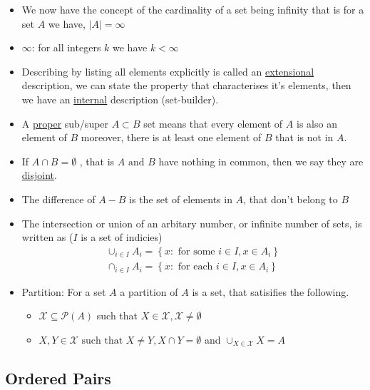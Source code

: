 \documentclass[11pt]{book}
\begin{document}
\begin{itemize}
    \item We now have the concept of the cardinality of a set being infinity that is for a set $A$ we have, $\left| A \right| = \infty $
    \item $\infty $: for all integers $k$ we have $k < \infty $ 
    \item Describing by listing all elements explicitly is called an \underline{extensional}  description, we can state the property that characterises it's elements, then we have an \underline{internal} description (set-builder).
    \item A \underline{proper}  sub/super $A \subset B$ set means that every element of $A$ is also an element of $B$ moreover, there is at least one element of $B$ that is not in $A$.   
    \item If $A \cap  B = \emptyset  $ , that is $A \text{ and } B$ have nothing in common, then we say they are \underline{disjoint}.
    \item The difference of $A - B$ is the set of elements in $A$, that don't belong to $B$ 
    \item The intersection or union of an arbitary number, or infinite number of sets, is written as ($I$ is a set of indicies)
        \begin{gather*}
            \cup _{i \in I} A_{i} = \left\{ x: \text{ for some } i\in I, x \in A_{i}  \right\} \\
            \cap  _{i \in I} A_{i} = \left\{ x: \text{ for each } i\in I, x \in A_{i}  \right\} 
        \end{gather*}
    \item Partition: For a set $A$ a partition of $A$ is a set, that satisifies the following.
        \begin{itemize}
            \item $\mathcal{X} \subseteq \mathcal{P}(A) $ such that $X \in \mathcal{X}, \mathcal{X} \neq \emptyset $ 
        \item $X,Y \in \mathcal{X} \text{ such that } X\neq Y, X\cap Y= \emptyset $ and $\cup _{X\in \mathcal{X} } X= A$ 
        \end{itemize}
\end{itemize}

\subsection{Ordered Pairs}%
\label{sub:ordered_pairs}
\end{document}
